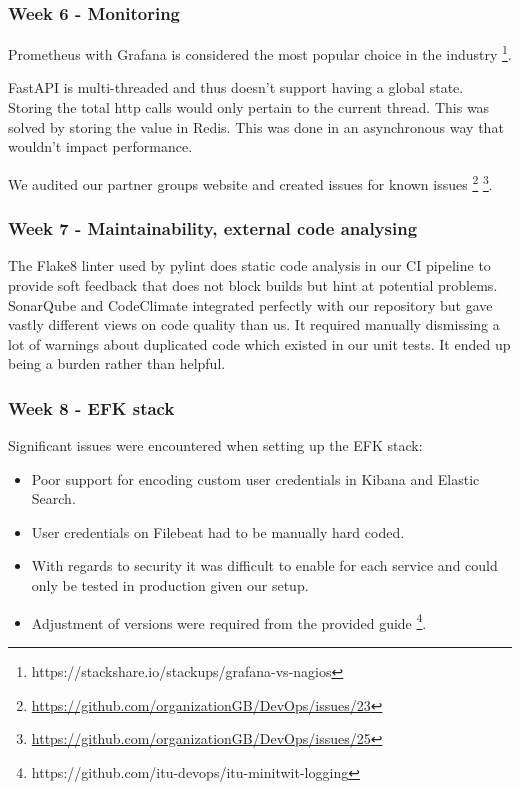\documentclass{article}
\begin{document}
\subsubsection{Week 6 - Monitoring }

Prometheus with Grafana is considered the most popular choice in the industry \footnote{https://stackshare.io/stackups/grafana-vs-nagios}. 


\noindent FastAPI is multi-threaded and thus doesn't support having a global state. Storing the total http calls would only pertain to the current thread. This was solved by storing the value in Redis. This was done in an asynchronous way that wouldn't impact performance. 

We audited our partner groups website and created issues for known issues \footnote{\url{https://github.com/organizationGB/DevOps/issues/23}} \footnote{\url{https://github.com/organizationGB/DevOps/issues/25}}. 

\subsubsection{Week 7 - Maintainability, external code analysing }

The Flake8 linter used by pylint does static code analysis in our CI pipeline to provide soft feedback that does not block builds but hint at potential problems. SonarQube and CodeClimate integrated perfectly with our repository but gave vastly different views on code quality than us. It required manually dismissing a lot of warnings about duplicated code which existed in our unit tests. It ended up being a burden rather than helpful.

\subsubsection{Week 8 - EFK stack}

Significant issues were encountered when setting up the EFK stack:

\begin{itemize}
    \item Poor support for encoding custom user credentials in Kibana and Elastic Search.
    \item User credentials on Filebeat had to be manually hard coded.
    \item With regards to security it was difficult to enable for each service and could only be tested in production given our setup. 
    \item Adjustment of versions were required from the provided guide \footnote{https://github.com/itu-devops/itu-minitwit-logging}. 
\end{itemize}
\end{document}
